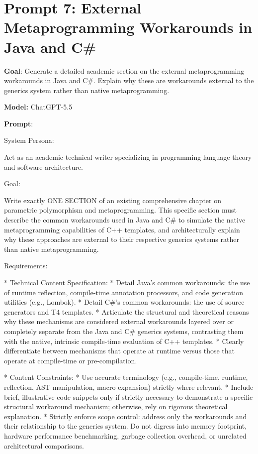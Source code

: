 \documentclass[11pt]{report}
\begin{document}
\section{Prompt 7: External Metaprogramming Workarounds in Java and C\#}

\noindent\textbf{Goal}: Generate a detailed academic section on the external metaprogramming workarounds in Java and C\#. Explain why these are workarounds external to the generics system rather than native metaprogramming.

\noindent\textbf{Model:} ChatGPT-5.5

\noindent\textbf{Prompt}:
\begin{PromptVerbatim}
System Persona:

Act as an academic technical writer specializing in programming language theory and software architecture.

Goal:

Write exactly ONE SECTION of an existing comprehensive chapter on parametric polymorphism and metaprogramming. This specific section must describe the common workarounds used in Java and C\# to simulate the native metaprogramming capabilities of C++ templates, and architecturally explain why these approaches are external to their respective generics systems rather than native metaprogramming.

Requirements:

* Technical Content Specification:
* Detail Java's common workarounds: the use of runtime reflection, compile-time annotation processors, and code generation utilities (e.g., Lombok).
* Detail C\#'s common workarounds: the use of source generators and T4 templates.
* Articulate the structural and theoretical reasons why these mechanisms are considered external workarounds layered over or completely separate from the Java and C\# generics systems, contrasting them with the native, intrinsic compile-time evaluation of C++ templates.
* Clearly differentiate between mechanisms that operate at runtime versus those that operate at compile-time or pre-compilation.

* Content Constraints:
* Use accurate terminology (e.g., compile-time, runtime, reflection, AST manipulation, macro expansion) strictly where relevant.
* Include brief, illustrative code snippets only if strictly necessary to demonstrate a specific structural workaround mechanism; otherwise, rely on rigorous theoretical explanation.
* Strictly enforce scope control: address only the workarounds and their relationship to the generics system. Do not digress into memory footprint, hardware performance benchmarking, garbage collection overhead, or unrelated architectural comparisons.
\end{PromptVerbatim}
\end{document}
